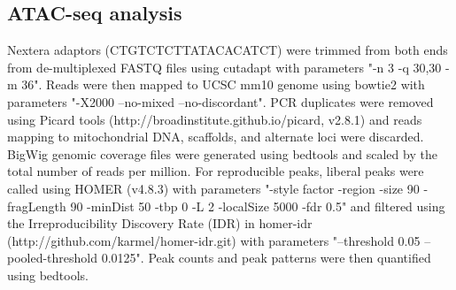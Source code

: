 \subsection{ATAC-seq analysis}
Nextera adaptors (CTGTCTCTTATACACATCT) were trimmed from both ends from de-multiplexed FASTQ files using cutadapt with parameters "-n 3 -q 30,30 -m 36". Reads were then mapped to UCSC mm10 genome using bowtie2 \citep{Langmead_2012} with parameters "-X2000 --no-mixed --no-discordant". PCR duplicates were removed using Picard tools (http://broadinstitute.github.io/picard, v2.8.1) and reads mapping to mitochondrial DNA, scaffolds, and alternate loci were discarded. BigWig genomic coverage files were generated using bedtools \citep{Quinlan_2010} and scaled by the total number of reads per million. For reproducible peaks, liberal peaks were called using HOMER (v4.8.3) \citep{Heinz_2010} with parameters "-style factor -region -size 90 -fragLength 90 -minDist 50 -tbp 0 -L 2 -localSize 5000 -fdr 0.5" and filtered using the Irreproducibility Discovery Rate (IDR) in homer-idr (http://github.com/karmel/homer-idr.git) with parameters "--threshold 0.05 --pooled-threshold 0.0125". Peak counts and peak patterns were then quantified using bedtools.

